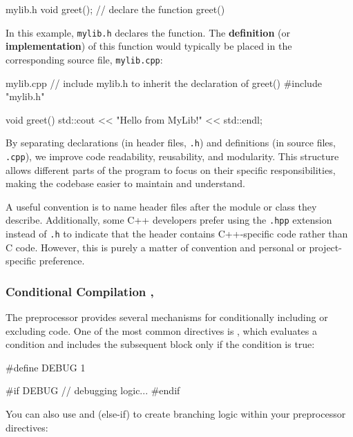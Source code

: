 \documentclass[12pt]{article}
\begin{document}
\begin{cxx}{mylib.h}
void greet(); // declare the function greet()
\end{cxx}

\noindent
In this example, \texttt{mylib.h} declares the  function. 
The \textbf{definition} (or \textbf{implementation}) of this function would typically be placed in the corresponding source file, \texttt{mylib.cpp}:

\begin{cxx}{mylib.cpp}
// include mylib.h to inherit the declaration of greet()
#include "mylib.h"

void greet()
{
	std::cout << "Hello from MyLib!" << std::endl;
}
\end{cxx}

\noindent
By separating declarations (in header files, \texttt{.h}) and definitions (in source files, \texttt{.cpp}), we improve code readability, reusability, and modularity.
This structure allows different parts of the program to focus on their specific responsibilities, making the codebase easier to maintain and understand.

\vspace{1em}
\noindent
A useful convention is to name header files after the module or class they describe.
Additionally, some C++ developers prefer using the \texttt{.hpp} extension instead of \texttt{.h} to indicate that the header contains C++-specific code rather than C code.
However, this is purely a matter of convention and personal or project-specific preference.

\subsubsection{Conditional Compilation , }
\label{sec:conditional-compilation}

\noindent
The preprocessor provides several mechanisms for conditionally including or excluding code.
One of the most common directives is , which evaluates a condition and includes the subsequent block only if the condition is true:

\begin{cxx}{}
#define DEBUG 1

#if DEBUG
	// debugging logic...
#endif
\end{cxx}

\noindent
You can also use  and  (else-if) to create branching logic within your preprocessor directives:
\end{document}
